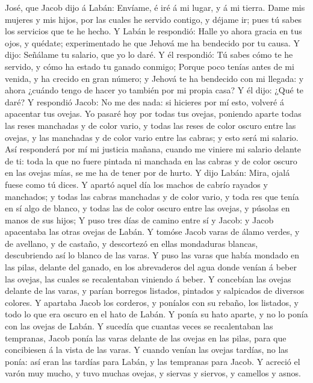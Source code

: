José, que Jacob dijo á Labán: Envíame, é iré á mi lugar, y á mi tierra.
 Dame mis mujeres y mis hijos, por las cuales he servido
contigo, y déjame ir; pues tú sabes los servicios que te he hecho.
 Y Labán le respondió: Halle yo ahora gracia en tus ojos, y
quédate; experimentado he que Jehová me ha bendecido por tu causa.
 Y dijo: Señálame tu salario, que yo lo daré. 
Y él respondió: Tú sabes cómo te he servido, y cómo ha estado tu ganado
conmigo;  Porque poco tenías antes de mi venida, y ha
crecido en gran número; y Jehová te ha bendecido con mi llegada: y ahora
¿cuándo tengo de hacer yo también por mi propia casa?  Y él
dijo: ¿Qué te daré? Y respondió Jacob: No me des nada: si hicieres por
mí esto, volveré á apacentar tus ovejas.  Yo pasaré hoy por
todas tus ovejas, poniendo aparte todas las reses manchadas y de color
vario, y todas las reses de color oscuro entre las ovejas, y las
manchadas y de color vario entre las cabras; y esto será mi salario.
 Así responderá por mí mi justicia mañana, cuando me
viniere mi salario delante de ti: toda la que no fuere pintada ni
manchada en las cabras y de color oscuro en las ovejas mías, se me ha de
tener por de hurto.  Y dijo Labán: Mira, ojalá fuese como
tú dices.  Y apartó aquel día los machos de cabrío rayados
y manchados; y todas las cabras manchadas y de color vario, y toda res
que tenía en sí algo de blanco, y todas las de color oscuro entre las
ovejas, y púsolas en manos de sus hijos;  Y puso tres días
de camino entre sí y Jacob: y Jacob apacentaba las otras ovejas de
Labán.  Y tomóse Jacob varas de álamo verdes, y de
avellano, y de castaño, y descortezó en ellas mondaduras blancas,
descubriendo así lo blanco de las varas.  Y puso las varas
que había mondado en las pilas, delante del ganado, en los abrevaderos
del agua donde venían á beber las ovejas, las cuales se recalentaban
viniendo á beber.  Y concebían las ovejas delante de las
varas, y parían borregos listados, pintados y salpicados de diversos
colores.  Y apartaba Jacob los corderos, y poníalos con su
rebaño, los listados, y todo lo que era oscuro en el hato de Labán. Y
ponía su hato aparte, y no lo ponía con las ovejas de Labán.
 Y sucedía que cuantas veces se recalentaban las tempranas,
Jacob ponía las varas delante de las ovejas en las pilas, para que
concibiesen á la vista de las varas.  Y cuando venían las
ovejas tardías, no las ponía: así eran las tardías para Labán, y las
tempranas para Jacob.  Y acreció el varón muy mucho, y tuvo
muchas ovejas, y siervas y siervos, y camellos y asnos.

